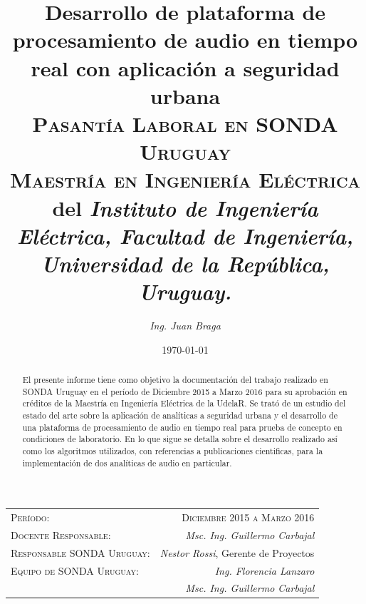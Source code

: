 \documentclass{article}
\title{\textbf{Desarrollo de plataforma de procesamiento de audio en tiempo real con aplicación a seguridad urbana}\\ \textsc{Pasantía Laboral en SONDA Uruguay}\\
\large \textsc{Maestría en Ingeniería Eléctrica} del \textit{Instituto de Ingeniería Eléctrica, Facultad de Ingeniería, Universidad de la República, Uruguay.}}
\author{\textit{Ing. Juan Braga}}
\date{\today}
\begin{document}
\maketitle 

\begin{center}
\begin{tabular}{l r}
\medskip
\textsc{Período:} & \textsc{Diciembre 2015 a Marzo 2016}\\ %
\textsc{Docente Responsable:} & \textit{Msc. Ing. Guillermo Carbajal} \\ 
\textsc{Responsable SONDA Uruguay:} & \textit{Nestor Rossi}, Gerente de Proyectos  \\
\textsc{Equipo de SONDA Uruguay:} & \textit{Ing. Florencia Lanzaro} \\ & \textit{Msc. Ing. Guillermo Carbajal} \\ 
\end{tabular}
\end{center}


\begin{abstract}
El presente informe tiene como objetivo la documentación del trabajo realizado en SONDA Uruguay en el período de Diciembre 2015 a Marzo 2016 para su aprobación en créditos de la Maestría en Ingeniería Eléctrica de la UdelaR. Se trató de un estudio del estado del arte sobre la aplicación de analíticas a seguridad urbana y el desarrollo de una plataforma de procesamiento de audio en tiempo real para prueba de concepto en condiciones de laboratorio. En lo que sigue se detalla sobre el desarrollo realizado así como los algoritmos utilizados, con referencias a publicaciones cientificas, para la implementación de dos analíticas de audio en particular. 
\end{abstract}

\end{document}
